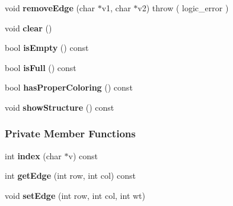 \begin{DoxyCompactItemize}
\item 
void {\bfseries remove\+Edge} (char $\ast$v1, char $\ast$v2)  throw ( logic\+\_\+error )\hypertarget{class_wt_graph_a7a1e566285ce7faefd211ba0d9ffa864}{}\label{class_wt_graph_a7a1e566285ce7faefd211ba0d9ffa864}

\item 
void {\bfseries clear} ()\hypertarget{class_wt_graph_ad73f37d58e6e5132fbf6191b35e54e4e}{}\label{class_wt_graph_ad73f37d58e6e5132fbf6191b35e54e4e}

\item 
bool {\bfseries is\+Empty} () const \hypertarget{class_wt_graph_ad521755a01e89cfd9e6cb4f3f0b8393b}{}\label{class_wt_graph_ad521755a01e89cfd9e6cb4f3f0b8393b}

\item 
bool {\bfseries is\+Full} () const \hypertarget{class_wt_graph_a2afac3672a8dd457da6dccc899e0a7f9}{}\label{class_wt_graph_a2afac3672a8dd457da6dccc899e0a7f9}

\item 
bool {\bfseries has\+Proper\+Coloring} () const \hypertarget{class_wt_graph_aad6215139213038e86eb7da9a3d6d2e6}{}\label{class_wt_graph_aad6215139213038e86eb7da9a3d6d2e6}

\item 
void {\bfseries show\+Structure} () const \hypertarget{class_wt_graph_aff09483a06de871dab7be3b5fb6a9f51}{}\label{class_wt_graph_aff09483a06de871dab7be3b5fb6a9f51}

\end{DoxyCompactItemize}
\subsubsection*{Private Member Functions}
\begin{DoxyCompactItemize}
\item 
int {\bfseries index} (char $\ast$v) const \hypertarget{class_wt_graph_a89dc6b3fdf5bd826cf82c1e0b6342fa4}{}\label{class_wt_graph_a89dc6b3fdf5bd826cf82c1e0b6342fa4}

\item 
int {\bfseries get\+Edge} (int row, int col) const \hypertarget{class_wt_graph_ace3f881c28ca9f26ef6e30da4bb40ef7}{}\label{class_wt_graph_ace3f881c28ca9f26ef6e30da4bb40ef7}

\item 
void {\bfseries set\+Edge} (int row, int col, int wt)\hypertarget{class_wt_graph_afe8dc83bbd09697988cad1c61439da80}{}\label{class_wt_graph_afe8dc83bbd09697988cad1c61439da80}

\end{DoxyCompactItemize}
